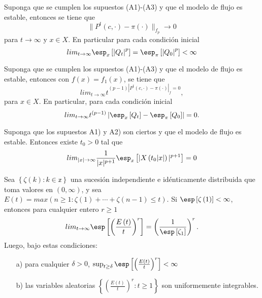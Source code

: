 \begin{Teo}\label{Tma.6.2}
Suponga que se cumplen los supuestos (A1)-(A3) y que el modelo de
flujo es estable, entonces se tiene que
\[\parallel P^{t}\left(c,\cdot\right)-\pi\left(\cdot\right)\parallel_{f_{p}}\rightarrow0\]
para $t\rightarrow\infty$ y $x\in X$. En particular para cada
condici\'on inicial
\[lim_{t\rightarrow\infty}\esp_{x}\left[\left|Q_{t}\right|^{p}\right]=\esp_{\pi}\left[\left|Q_{0}\right|^{p}\right]<\infty\]
\end{Teo}


\begin{Teo}\label{Tma.6.3}
Suponga que se cumplen los supuestos (A1)-(A3) y que el modelo de
flujo es estable, entonces con
$f\left(x\right)=f_{1}\left(x\right)$, se tiene que
\[lim_{t\rightarrow\infty}t^{(p-1)\left|P^{t}\left(c,\cdot\right)-\pi\left(\cdot\right)\right|_{f}=0},\]
para $x\in X$. En particular, para cada condici\'on inicial
\[lim_{t\rightarrow\infty}t^{(p-1)}\left|\esp_{x}\left[Q_{t}\right]-\esp_{\pi}\left[Q_{0}\right]\right|=0.\]
\end{Teo}



\begin{Prop}\label{Prop.5.1.DaiSean}
Suponga que los supuestos A1) y A2) son ciertos y que el modelo de
flujo es estable. Entonces existe $t_{0}>0$ tal que
\begin{equation}
lim_{|x|\rightarrow\infty}\frac{1}{|x|^{p+1}}\esp_{x}\left[|X\left(t_{0}|x|\right)|^{p+1}\right]=0
\end{equation}
\end{Prop}

\begin{Lemma}\label{Lema.5.2.DaiSean}
 Sea $\left\{\zeta\left(k\right):k\in \mathbb{z}\right\}$ una sucesi\'on independiente e id\'enticamente distribuida que toma valores en $\left(0,\infty\right)$,
y sea
$E\left(t\right)=max\left(n\geq1:\zeta\left(1\right)+\cdots+\zeta\left(n-1\right)\leq
t\right)$. Si $\esp\left[\zeta\left(1\right)\right]<\infty$,
entonces para cualquier entero $r\geq1$
\begin{equation}
 lim_{t\rightarrow\infty}\esp\left[\left(\frac{E\left(t\right)}{t}\right)^{r}\right]=\left(\frac{1}{\esp\left[\zeta_{1}\right]}\right)^{r}.
\end{equation}
Luego, bajo estas condiciones:
\begin{itemize}
 \item[a)] para cualquier $\delta>0$, $\sup_{t\geq\delta}\esp\left[\left(\frac{E\left(t\right)}{t}\right)^{r}\right]<\infty$
\item[b)] las variables aleatorias
$\left\{\left(\frac{E\left(t\right)}{t}\right)^{r}:t\geq1\right\}$
son uniformemente integrables.
\end{itemize}
\end{Lemma}

